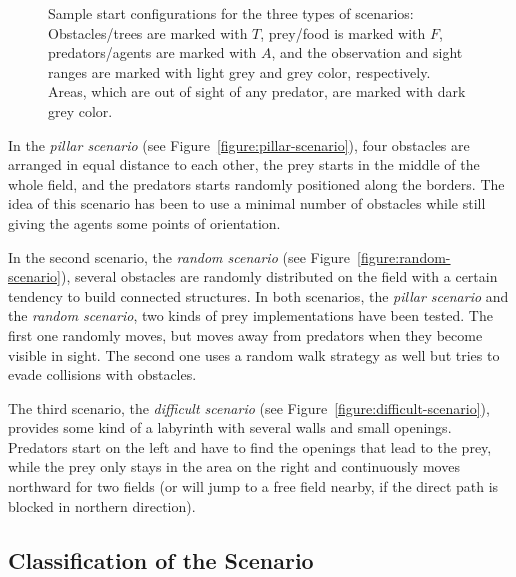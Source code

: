 \begin{figure}[ht]
	\hfill
  \hfill
  \caption{Sample start configurations for the three types of scenarios: Obstacles/trees are marked with $T$, prey/food is marked with $F$, predators/agents are marked with $A$, and the observation and sight ranges are marked with light grey and grey color, respectively. Areas, which are out of sight of any predator, are marked with dark grey color.}
  \label{figure:scenarios}
\end{figure}

In the \emph{pillar scenario} (see Figure~\ref{figure:pillar-scenario}), four obstacles are arranged in equal distance to each other, the prey starts in the middle of the whole field, and the predators starts randomly positioned along the borders. The idea of this scenario has been to use a minimal number of obstacles while still giving the agents some points of orientation.

In the second scenario, the \emph{random scenario} (see Figure~\ref{figure:random-scenario}), several obstacles are randomly distributed on the field with a certain tendency to build connected structures. In both scenarios, the \emph{pillar scenario} and the \emph{random scenario}, two kinds of prey implementations have been tested. The first one randomly moves, but moves away from predators when they become visible in sight. The second one uses a random walk strategy as well but tries to evade collisions with obstacles.

The third scenario, the \emph{difficult scenario} (see Figure~\ref{figure:difficult-scenario}), provides some kind of a labyrinth with several walls and small openings. Predators start on the left and have to find the openings that lead to the prey, while the prey only stays in the area on the right and continuously moves northward for two fields (or will jump to a free field nearby, if the direct path is blocked in northern direction).

\subsection{Classification of the Scenario}
\label{subsection:scenario-classification}

